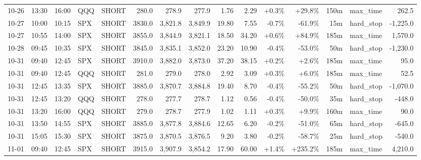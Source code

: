 \documentclass[11pt,a4paper,twoside]{article}
\begin{document}
\begin{landscape}
\begin{center}
\begin{longtable}{>{\color{txtmain}}l l l l l r r r r r r r r >{\color{txtmain}}l r}
10-26 & 13:30 & 16:00 & QQQ & SHORT & 280.0 & 278.9 & 277.9 & 1.76 & 2.29 & \textcolor{wingreen}{+0.3\%} & \textcolor{wingreen}{+29.8\%} & 150m & max\_time & \textcolor{wingreen}{262.5} \\
10-27 & 10:00 & 10:15 & SPX & SHORT & 3830.0 & 3,821.8 & 3,849.9 & 19.80 & 7.55 & \textcolor{lossred}{-0.7\%} & \textcolor{lossred}{-61.9\%} & 15m & hard\_stop & \textcolor{lossred}{-1,225.0} \\
10-27 & 10:55 & 14:00 & SPX & SHORT & 3855.0 & 3,844.9 & 3,821.1 & 18.50 & 34.20 & \textcolor{wingreen}{+0.6\%} & \textcolor{wingreen}{+84.9\%} & 185m & max\_time & \textcolor{wingreen}{1,570.0} \\
10-28 & 09:45 & 10:35 & SPX & SHORT & 3845.0 & 3,835.1 & 3,852.0 & 23.20 & 10.90 & \textcolor{lossred}{-0.4\%} & \textcolor{lossred}{-53.0\%} & 50m & hard\_stop & \textcolor{lossred}{-1,230.0} \\
10-31 & 09:40 & 12:45 & SPX & SHORT & 3910.0 & 3,882.0 & 3,873.0 & 37.20 & 38.15 & \textcolor{wingreen}{+0.2\%} & \textcolor{wingreen}{+2.6\%} & 185m & max\_time & \textcolor{wingreen}{95.0} \\
10-31 & 09:40 & 12:45 & QQQ & SHORT & 281.0 & 279.0 & 278.0 & 2.92 & 3.09 & \textcolor{wingreen}{+0.3\%} & \textcolor{wingreen}{+6.0\%} & 185m & max\_time & \textcolor{wingreen}{52.5} \\
10-31 & 12:45 & 13:35 & SPX & SHORT & 3885.0 & 3,870.7 & 3,884.8 & 19.40 & 8.70 & \textcolor{lossred}{-0.4\%} & \textcolor{lossred}{-55.2\%} & 50m & hard\_stop & \textcolor{lossred}{-1,070.0} \\
10-31 & 12:45 & 13:20 & QQQ & SHORT & 278.0 & 277.7 & 278.7 & 1.12 & 0.56 & \textcolor{lossred}{-0.4\%} & \textcolor{lossred}{-50.0\%} & 35m & hard\_stop & \textcolor{lossred}{-448.0} \\
10-31 & 13:20 & 16:00 & QQQ & SHORT & 279.0 & 278.7 & 277.9 & 1.02 & 1.11 & \textcolor{wingreen}{+0.3\%} & \textcolor{wingreen}{+9.9\%} & 160m & max\_time & \textcolor{wingreen}{90.0} \\
10-31 & 13:50 & 14:55 & SPX & SHORT & 3885.0 & 3,877.8 & 3,884.6 & 12.65 & 6.20 & \textcolor{lossred}{-0.2\%} & \textcolor{lossred}{-51.0\%} & 65m & hard\_stop & \textcolor{lossred}{-645.0} \\
10-31 & 15:05 & 15:30 & SPX & SHORT & 3875.0 & 3,870.5 & 3,876.5 & 9.20 & 3.80 & \textcolor{lossred}{-0.2\%} & \textcolor{lossred}{-58.7\%} & 25m & hard\_stop & \textcolor{lossred}{-540.0} \\
11-01 & 09:40 & 12:45 & SPX & SHORT & 3915.0 & 3,907.9 & 3,854.2 & 17.90 & 60.00 & \textcolor{wingreen}{+1.4\%} & \textcolor{wingreen}{+235.2\%} & 185m & max\_time & \textcolor{wingreen}{4,210.0} \\

\end{longtable}
\end{center}
\end{landscape}
\end{document}

